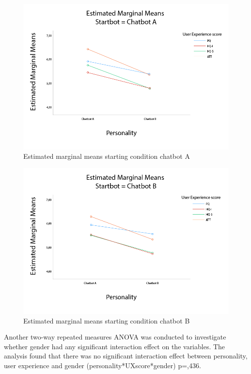 \begin{figure}[h]
    \centering
    \includegraphics[scale=0.4]{figures/MMeanStartbotA.png}
    \caption{Estimated marginal means starting condition chatbot A}
    \label{fig:startA}
\end{figure}

\begin{figure}
    \centering
    \includegraphics[scale=0.4]{figures/MMeanStartbotB.png}
    \caption{Estimated marginal means starting condition chatbot B}
    \label{fig:startB}
\end{figure}

Another two-way repeated measures ANOVA was conducted to investigate whether gender had any significant interaction effect on the variables. The analysis found that there was no significant interaction effect between personality, user experience and gender (personality*UXscore*gender) p=,436.

